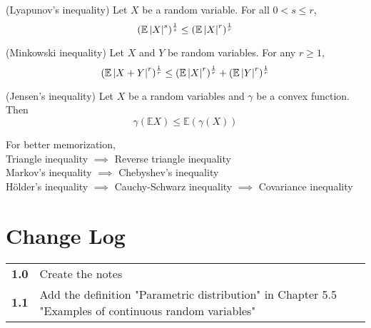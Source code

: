 \documentclass{huhtakm-template-book}
\newcommand{\expect}{\mathbb{E}}
\begin{document}
\begin{thm}(Lyapunov's inequality)
	Let $X$ be a random variable. For all $0<s\leq r$,
	\begin{equation*}
		(\expect\abs{X}^{s})^{\frac{1}{s}}\leq(\expect\abs{X}^{r})^{\frac{1}{r}}
	\end{equation*}
\end{thm}
\begin{thm}(Minkowski inequality)
	Let $X$ and $Y$ be random variables. For any $r\geq 1$,
	\begin{equation*}
		(\expect\abs{X+Y}^{r})^{\frac{1}{r}}\leq(\expect\abs{X}^{r})^{\frac{1}{r}}+(\expect\abs{Y}^{r})^{\frac{1}{r}}
	\end{equation*}
\end{thm}
\begin{thm}(Jensen's inequality)
	Let $X$ be a random variables and $\gamma$ be a convex function. Then
	\begin{equation*}
		\gamma(\expect X)\leq\expect(\gamma(X))
	\end{equation*}
\end{thm}
For better memorization,\\
Triangle inequality $\implies$ Reverse triangle inequality\\
Markov's inequality $\implies$ Chebyshev's inequality\\
H\"older's inequality $\implies$ Cauchy-Schwarz inequality $\implies$ Covariance inequality

\chapter*{Change Log}
\begin{tabular}{cl}
	\textbf{1.0} & Create the notes\\
	\textbf{1.1} & Add the definition "Parametric distribution" in Chapter 5.5 "Examples of continuous random variables"
\end{tabular}
\end{document}
